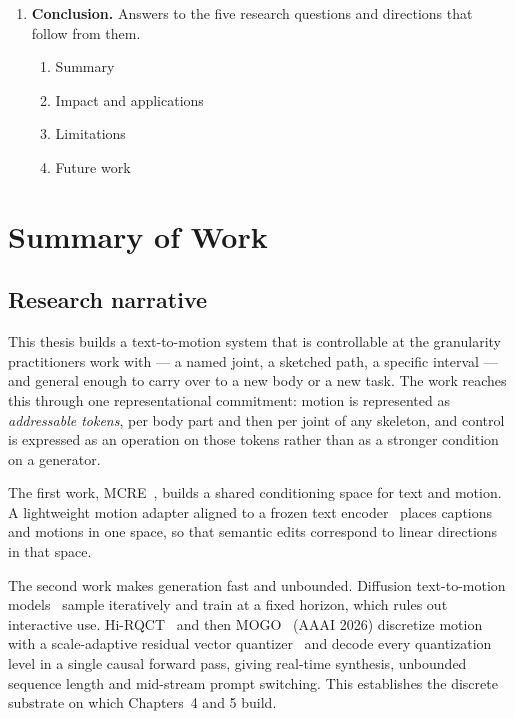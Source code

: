 \documentclass[11pt,a4paper]{report}
\begin{document}
\begin{enumerate}[leftmargin=1.4em]
\item \textbf{Conclusion.} Answers to the five research questions and
  directions that follow from them.
  \begin{enumerate}[leftmargin=1.4em]
  \item Summary
  \item Impact and applications
  \item Limitations
  \item Future work
  \end{enumerate}
\end{enumerate}


\chapter{Summary of Work}

\section{Research narrative}

This thesis builds a text-to-motion system that is controllable at the
granularity practitioners work with --- a named joint, a sketched path, a
specific interval --- and general enough to carry over to a new body or a new
task. The work reaches this through one representational commitment: motion is
represented as \emph{addressable tokens}, per body part and then per joint of
any skeleton, and control is expressed as an operation on those tokens rather
than as a stronger condition on a generator.

The first work, MCRE~\cite{sun2024mcre}, builds a shared conditioning space for
text and motion. A lightweight motion adapter aligned to a frozen text
encoder~\cite{radford2021learning} places captions and motions in one space, so
that semantic edits correspond to linear directions in that space.

The second work makes generation fast and unbounded. Diffusion text-to-motion
models~\cite{tevet2022human,chen2023executing,zhang2024motiondiffuse} sample
iteratively and train at a fixed horizon, which rules out interactive use.
Hi-RQCT~\cite{sun2025hirqct} and then MOGO~\cite{sun2025mogo} (AAAI 2026) discretize motion
with a scale-adaptive residual vector
quantizer~\cite{vandenoord2017neural,zeghidour2022soundstream} and decode every
quantization level in a single causal forward pass, giving real-time synthesis,
unbounded sequence length and mid-stream prompt switching. This establishes the
discrete substrate on which Chapters~4 and 5 build.
\end{document}
